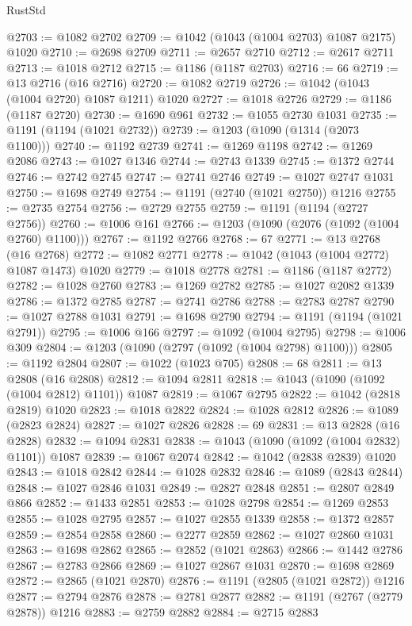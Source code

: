 \begin{lexlean}{RustStd}
\begin{coremodule}
@2703 := @1082 @2702
@2709 := @1042 (@1043 (@1004 @2703) @1087 @2175) @1020
@2710 := @2698 @2709
@2711 := @2657 @2710
@2712 := @2617 @2711
@2713 := @1018 @2712
@2715 := @1186 (@1187 @2703)
@2716 := 66
@2719 := @13 @2716 (@16 @2716)
@2720 := @1082 @2719
@2726 := @1042 (@1043 (@1004 @2720) @1087 @1211) @1020
@2727 := @1018 @2726
@2729 := @1186 (@1187 @2720)
@2730 := @1690 @961
@2732 := @1055 @2730 @1031
@2735 := @1191 (@1194 (@1021 @2732))
@2739 := @1203 (@1090 (@1314 (@2073 @1100)))
@2740 := @1192 @2739
@2741 := @1269 @1198
@2742 := @1269 @2086
@2743 := @1027 @1346
@2744 := @2743 @1339
@2745 := @1372 @2744
@2746 := @2742 @2745
@2747 := @2741 @2746
@2749 := @1027 @2747 @1031
@2750 := @1698 @2749
@2754 := @1191 (@2740 (@1021 @2750)) @1216
@2755 := @2735 @2754
@2756 := @2729 @2755
@2759 := @1191 (@1194 (@2727 @2756))
@2760 := @1006 @161
@2766 := @1203 (@1090 (@2076 (@1092 (@1004 @2760) @1100)))
@2767 := @1192 @2766
@2768 := 67
@2771 := @13 @2768 (@16 @2768)
@2772 := @1082 @2771
@2778 := @1042 (@1043 (@1004 @2772) @1087 @1473) @1020
@2779 := @1018 @2778
@2781 := @1186 (@1187 @2772)
@2782 := @1028 @2760
@2783 := @1269 @2782
@2785 := @1027 @2082 @1339
@2786 := @1372 @2785
@2787 := @2741 @2786
@2788 := @2783 @2787
@2790 := @1027 @2788 @1031
@2791 := @1698 @2790
@2794 := @1191 (@1194 (@1021 @2791))
@2795 := @1006 @166
@2797 := @1092 (@1004 @2795)
@2798 := @1006 @309
@2804 := @1203 (@1090 (@2797 (@1092 (@1004 @2798) @1100)))
@2805 := @1192 @2804
@2807 := @1022 (@1023 @705)
@2808 := 68
@2811 := @13 @2808 (@16 @2808)
@2812 := @1094 @2811
@2818 := @1043 (@1090 (@1092 (@1004 @2812) @1101)) @1087
@2819 := @1067 @2795
@2822 := @1042 (@2818 @2819) @1020
@2823 := @1018 @2822
@2824 := @1028 @2812
@2826 := @1089 (@2823 @2824)
@2827 := @1027 @2826
@2828 := 69
@2831 := @13 @2828 (@16 @2828)
@2832 := @1094 @2831
@2838 := @1043 (@1090 (@1092 (@1004 @2832) @1101)) @1087
@2839 := @1067 @2074
@2842 := @1042 (@2838 @2839) @1020
@2843 := @1018 @2842
@2844 := @1028 @2832
@2846 := @1089 (@2843 @2844)
@2848 := @1027 @2846 @1031
@2849 := @2827 @2848
@2851 := @2807 @2849 @866
@2852 := @1433 @2851
@2853 := @1028 @2798
@2854 := @1269 @2853
@2855 := @1028 @2795
@2857 := @1027 @2855 @1339
@2858 := @1372 @2857
@2859 := @2854 @2858
@2860 := @2277 @2859
@2862 := @1027 @2860 @1031
@2863 := @1698 @2862
@2865 := @2852 (@1021 @2863)
@2866 := @1442 @2786
@2867 := @2783 @2866
@2869 := @1027 @2867 @1031
@2870 := @1698 @2869
@2872 := @2865 (@1021 @2870)
@2876 := @1191 (@2805 (@1021 @2872)) @1216
@2877 := @2794 @2876
@2878 := @2781 @2877
@2882 := @1191 (@2767 (@2779 @2878)) @1216
@2883 := @2759 @2882
@2884 := @2715 @2883

\end{coremodule}
\end{lexlean}
